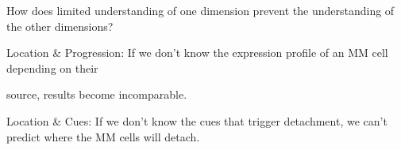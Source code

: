 







%
\label{sec:discussion_conclusion_cancer}%



How does limited understanding of one dimension prevent the understanding of the
other dimensions?

Location \& Progression: If we don't know the expression profile of an MM cell
depending on their

source, results become incomparable.

Location \& Cues: If we don't know the cues that trigger detachment, we can't
predict where the MM cells will detach.



